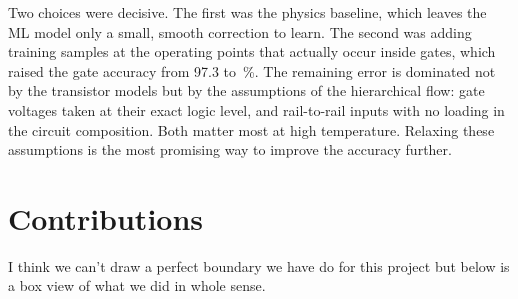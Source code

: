 \documentclass[12pt]{article}
\begin{document}
Two choices were decisive. The first was the physics baseline, which leaves the ML model only a
small, smooth correction to learn. The second was adding training samples at the operating points
that actually occur inside gates, which raised the gate accuracy from 97.3 to \GateMeanAcc\,\%.
The remaining error is dominated not by the transistor models but by the assumptions of the
hierarchical flow: gate voltages taken at their exact logic level, and rail-to-rail inputs with no
loading in the circuit composition. Both matter most at high temperature. Relaxing these
assumptions is the most promising way to improve the accuracy further.

\section{Contributions}
I think we can't draw a perfect boundary we have do for this project but below  is a box view of what we did in whole sense. 
\end{document}
